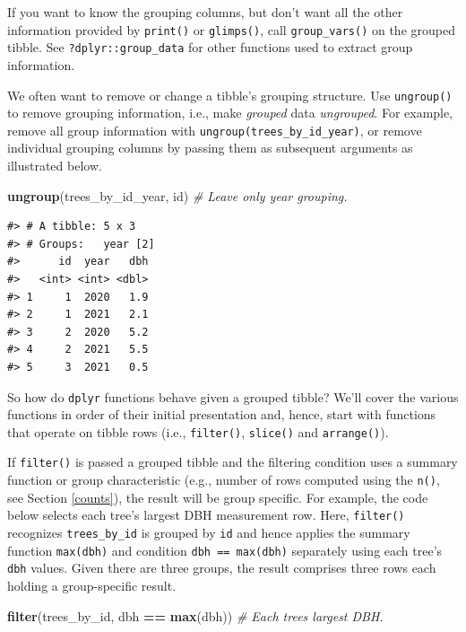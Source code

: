 \documentclass[
  11pt,
]{krantz}
\newenvironment{Shaded}{\begin{snugshade}}{\end{snugshade}}
\newcommand{\CommentTok}[1]{\textcolor[rgb]{0.56,0.35,0.01}{\textit{#1}}}
\newcommand{\KeywordTok}[1]{\textcolor[rgb]{0.13,0.29,0.53}{\textbf{#1}}}
\newcommand{\NormalTok}[1]{#1}
\newcommand{\OperatorTok}[1]{\textcolor[rgb]{0.81,0.36,0.00}{\textbf{#1}}}
\newcommand{\StringTok}[1]{\textcolor[rgb]{0.31,0.60,0.02}{#1}}
\theoremstyle{definition}
\theoremstyle{definition}
\theoremstyle{definition}
\theoremstyle{definition}
\theoremstyle{remark}
\begin{document}
If you want to know the grouping columns, but don't want all the other information provided by \texttt{print()} or \texttt{glimps()}, call \texttt{group\_vars()} on the grouped tibble. See \texttt{?dplyr::group\_data} for other functions used to extract group information.

We often want to remove or change a tibble's grouping structure. Use \texttt{ungroup()} to remove grouping information, i.e., make \emph{grouped} data \emph{ungrouped}. For example, remove all group information with \texttt{ungroup(trees\_by\_id\_year)}, or remove individual grouping columns by passing them as subsequent arguments as illustrated below.

\begin{Shaded}
\begin{Highlighting}[]
\KeywordTok{ungroup}\NormalTok{(trees\_by\_id\_year, id) }\CommentTok{\# Leave only year grouping.}
\end{Highlighting}
\end{Shaded}

\begin{verbatim}
#> # A tibble: 5 x 3
#> # Groups:   year [2]
#>      id  year   dbh
#>   <int> <int> <dbl>
#> 1     1  2020   1.9
#> 2     1  2021   2.1
#> 3     2  2020   5.2
#> 4     2  2021   5.5
#> 5     3  2021   0.5
\end{verbatim}

So how do \texttt{dplyr} functions behave given a grouped tibble? We'll cover the various functions in order of their initial presentation and, hence, start with functions that operate on tibble rows (i.e., \texttt{filter()}, \texttt{slice()} and \texttt{arrange()}).

If \texttt{filter()} is passed a grouped tibble and the filtering condition uses a summary function or group characteristic (e.g., number of rows computed using the \texttt{n()}, see Section \ref{counts}), the result will be group specific. For example, the code below selects each tree's largest DBH measurement row. Here, \texttt{filter()} recognizes \texttt{trees\_by\_id} is grouped by \texttt{id} and hence applies the summary function \texttt{max(dbh)} and condition \texttt{dbh\ ==\ max(dbh)} separately using each tree's \texttt{dbh} values. Given there are three groups, the result comprises three rows each holding a group-specific result.

\begin{Shaded}
\begin{Highlighting}[]
\KeywordTok{filter}\NormalTok{(trees\_by\_id, dbh }\OperatorTok{==}\StringTok{ }\KeywordTok{max}\NormalTok{(dbh)) }\CommentTok{\# Each tree\textquotesingle{}s largest DBH.}
\end{Highlighting}
\end{Shaded}
\end{document}
